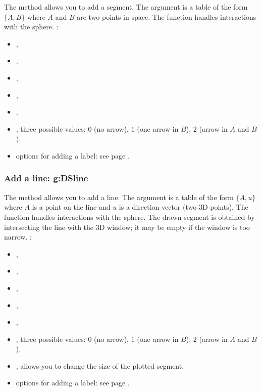The  method allows you to add a segment. The argument  is a table of the form $\{A,B\}$ where $A$ and $B$ are two points in space. The function handles interactions with the sphere. \writeoptions:
\begin{itemize}
    \item {},
    \item {},
    \item {},
    \item {},
    \item {},
    \item {}, three possible values: $0$ (no arrow), $1$ (one arrow in $B$), $2$ (arrow in $A$ and $B$).
    \item options for adding a label: see page \pageref{addlabel}.
\end{itemize}

\subsubsection{Add a line: g:DSline}

The  method allows you to add a line. The argument  is a table of the form $\{A,u\}$ where $A$ is a point on the line and $u$ is a direction vector (two 3D points). The function handles interactions with the sphere. The drawn segment is obtained by intersecting the line with the 3D window; it may be empty if the window is too narrow. \writeoptions:
\begin{itemize}
    \item {},
    \item {},
    \item {},
    \item {},
    \item {},
    \item {}, three possible values: $0$ (no arrow), $1$ (one arrow in $B$), $2$ (arrow in $A$ and $B$).
    \item {}, allows you to change the size of the plotted segment.
    \item options for adding a label: see page \pageref{addlabel}.
\end{itemize}

